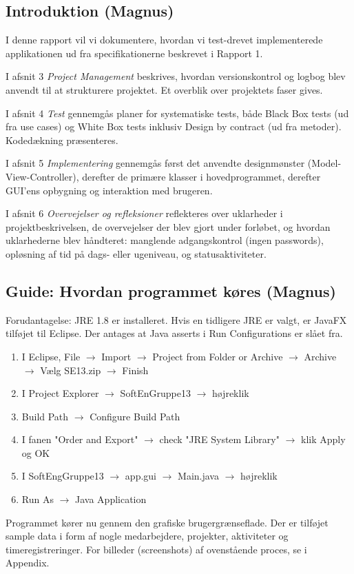 \subsection{Introduktion (Magnus)}
I denne rapport vil vi dokumentere, hvordan vi test-drevet implementerede applikationen ud fra specifikationerne beskrevet i Rapport 1.

I afsnit 3 \textit{Project Management} beskrives, hvordan versionskontrol og logbog blev anvendt til at strukturere projektet. Et overblik over projektets faser gives.

I afsnit 4 \textit{Test} gennemgås planer for systematiske tests, både Black Box tests (ud fra use cases) og White Box tests inklusiv Design by contract (ud fra metoder). Kodedækning præsenteres.

I afsnit 5 \textit{Implementering} gennemgås først det anvendte designmønster (Model-View-Controller), derefter de primære klasser i hovedprogrammet, derefter GUI'ens opbygning og interaktion med brugeren.

I afsnit 6 \textit{Overvejelser og refleksioner} reflekteres over uklarheder i projektbeskrivelsen, de overvejelser der blev gjort under forløbet, og hvordan uklarhederne blev håndteret: manglende adgangskontrol (ingen passwords), opløsning af tid på dags- eller ugeniveau, og statusaktiviteter. 

\subsection{Guide: Hvordan programmet køres (Magnus)}

Forudantagelse: JRE 1.8 er installeret. Hvis en tidligere JRE er valgt, er JavaFX tilføjet til Eclipse. Der antages at Java asserts i Run Configurations er slået fra.

\begin{enumerate}
\item I Eclipse, File $\rightarrow$ Import $\rightarrow$ Project from Folder or Archive $\rightarrow$ Archive $\rightarrow$ Vælg SE13.zip $\rightarrow$ Finish
\item I Project Explorer $\rightarrow$ SoftEnGruppe13 $\rightarrow$ højreklik
\item Build Path $\rightarrow$ Configure Build Path
\item I fanen "Order and Export" $\rightarrow$ check "JRE System Library" $\rightarrow$ klik Apply og OK
\item I SoftEngGruppe13 $\rightarrow$ app.gui $\rightarrow$ Main.java $\rightarrow$ højreklik
\item Run As $\rightarrow$ Java Application
\end{enumerate}


Programmet kører nu gennem den grafiske brugergrænseflade. Der er tilføjet sample data i form af nogle medarbejdere, projekter, aktiviteter og timeregistreringer. For billeder (screenshots) af ovenstående proces, se i Appendix.

